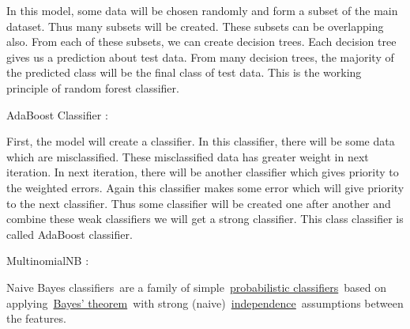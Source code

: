 \documentclass[12pt]{article}
\begin{document}
\begin{justify}
{\fontsize{14pt}{16.8pt}\selectfont  In this model, some data will be chosen randomly and form a subset of the main dataset. Thus many subsets will be created. These subsets can be overlapping also. From each of these subsets, we can create decision trees. Each decision tree gives us a prediction about test data. From many decision trees, the majority of the predicted class will be the final class of test data. This is the working principle of random forest classifier.\par}
\end{justify}\par


\vspace{\baselineskip}

\vspace{\baselineskip}
\begin{justify}
{\fontsize{14pt}{16.8pt}\selectfont AdaBoost Classifier : \par}
\end{justify}\par

\begin{justify}
{\fontsize{14pt}{16.8pt}\selectfont First, the model will create a classifier. In this classifier, there will be some data which are misclassified. These misclassified data has greater weight in next iteration. In next iteration, there will be another classifier which gives priority to the weighted errors. Again this classifier makes some error which will give priority to the next classifier. Thus some classifier will be created one after another and combine these weak classifiers we will get a strong classifier. This class classifier is called AdaBoost classifier. \par}
\end{justify}\par


\vspace{\baselineskip}

\vspace{\baselineskip}
\begin{justify}
{\fontsize{14pt}{16.8pt}\selectfont MultinomialNB : \par}
\end{justify}\par

\begin{justify}
{\fontsize{14pt}{16.8pt}\selectfont \textcolor[HTML]{222222}{Naive Bayes classifiers are a family of simple \href{https://en.wikipedia.org/wiki/Probabilistic\_classifier}{probabilistic classifiers} based on applying \href{https://en.wikipedia.org/wiki/Bayes$\%$ 27\_theorem}{Bayes' theorem} with strong (naive) \href{https://en.wikipedia.org/wiki/Statistical\_independence}{independence} assumptions between the features.}\par}
\end{justify}\par
\end{document}

